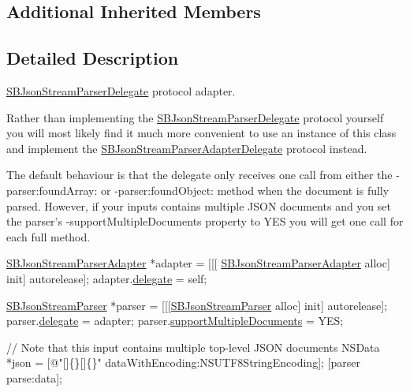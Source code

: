 \subsection*{Additional Inherited Members}


\subsection{Detailed Description}
\hyperlink{protocol_s_b_json_stream_parser_delegate-p}{S\-B\-Json\-Stream\-Parser\-Delegate} protocol adapter. 

Rather than implementing the \hyperlink{protocol_s_b_json_stream_parser_delegate-p}{S\-B\-Json\-Stream\-Parser\-Delegate} protocol yourself you will most likely find it much more convenient to use an instance of this class and implement the \hyperlink{protocol_s_b_json_stream_parser_adapter_delegate-p}{S\-B\-Json\-Stream\-Parser\-Adapter\-Delegate} protocol instead.

The default behaviour is that the delegate only receives one call from either the -\/parser\-:found\-Array\-: or -\/parser\-:found\-Object\-: method when the document is fully parsed. However, if your inputs contains multiple J\-S\-O\-N documents and you set the parser's -\/support\-Multiple\-Documents property to Y\-E\-S you will get one call for each full method.


\begin{DoxyCode}
\hyperlink{interface_s_b_json_stream_parser_adapter}{SBJsonStreamParserAdapter} *adapter = [[[
      \hyperlink{interface_s_b_json_stream_parser_adapter}{SBJsonStreamParserAdapter} alloc] init] autorelease];
adapter.\hyperlink{interface_s_b_json_stream_parser_adapter_a9d336f9c9e1caf3291f80918cb13188e}{delegate} = \textcolor{keyword}{self};

\hyperlink{interface_s_b_json_stream_parser}{SBJsonStreamParser} *parser = [[[\hyperlink{interface_s_b_json_stream_parser}{SBJsonStreamParser} alloc] init] 
      autorelease];
parser.\hyperlink{interface_s_b_json_stream_parser_a1a4e90ce1ca9b55e7696db77ef6bf20c}{delegate} = adapter;
parser.\hyperlink{interface_s_b_json_stream_parser_afd976c605b67edbb8b7abbebcc5b4093}{supportMultipleDocuments} = YES;

\textcolor{comment}{// Note that this input contains multiple top-level JSON documents}
NSData *json = [\textcolor{stringliteral}{@"[]\{\}[]\{\}"} dataWithEncoding:NSUTF8StringEncoding]; 
[parser parse:data];
\end{DoxyCode}


